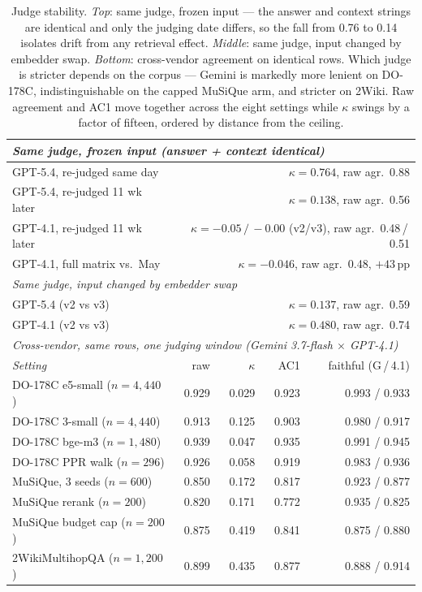 \begin{table}[t]
  \centering
  \caption{Judge stability. \textit{Top}: same judge, frozen input --- the answer and context strings are identical and only the judging date differs, so the fall from 0.76 to 0.14 isolates drift from any retrieval effect. \textit{Middle}: same judge, input changed by embedder swap. \textit{Bottom}: cross-vendor agreement on identical rows. Which judge is stricter depends on the corpus --- Gemini is markedly more lenient on DO-178C, indistinguishable on the capped MuSiQue arm, and stricter on 2Wiki. Raw agreement and AC1 move together across the eight settings while $\kappa$ swings by a factor of fifteen, ordered by distance from the ceiling.}
  \label{tab:judges}
  \small
  \setlength{\tabcolsep}{4pt}
    \begin{tabular}{l rrrr}
    \toprule
    \multicolumn{5}{l}{\textit{Same judge, frozen input (answer + context identical)}} \\
    \midrule
    GPT-5.4, re-judged same day & \multicolumn{4}{r}{$\kappa = 0.764$, raw agr.\ 0.88} \\
    GPT-5.4, re-judged 11 wk later & \multicolumn{4}{r}{$\kappa = 0.138$, raw agr.\ 0.56} \\
    GPT-4.1, re-judged 11 wk later & \multicolumn{4}{r}{$\kappa = -0.05\,/\,-0.00$ (v2/v3), raw agr.\ 0.48\,/\,0.51} \\
    GPT-4.1, full matrix vs.\ May & \multicolumn{4}{r}{$\kappa = -0.046$, raw agr.\ 0.48, $+43$\,pp} \\
    \midrule
    \multicolumn{5}{l}{\textit{Same judge, input changed by embedder swap}} \\
    \midrule
    GPT-5.4 (v2 vs v3) & \multicolumn{4}{r}{$\kappa = 0.137$, raw agr.\ 0.59} \\
    GPT-4.1 (v2 vs v3) & \multicolumn{4}{r}{$\kappa = 0.480$, raw agr.\ 0.74} \\
    \midrule
    \multicolumn{5}{l}{\textit{Cross-vendor, same rows, one judging window (Gemini 3.7-flash $\times$ GPT-4.1)}} \\
    \midrule
    \textit{Setting} & raw & $\kappa$ & AC1 & faithful (G\,/\,4.1) \\
    \midrule
    DO-178C e5-small ($n{=}4{,}440$) & 0.929 & 0.029 & 0.923 & 0.993 / 0.933 \\
    DO-178C 3-small ($n{=}4{,}440$)  & 0.913 & 0.125 & 0.903 & 0.980 / 0.917 \\
    DO-178C bge-m3 ($n{=}1{,}480$)   & 0.939 & 0.047 & 0.935 & 0.991 / 0.945 \\
    DO-178C PPR walk ($n{=}296$)     & 0.926 & 0.058 & 0.919 & 0.983 / 0.936 \\
    MuSiQue, 3 seeds ($n{=}600$)     & 0.850 & 0.172 & 0.817 & 0.923 / 0.877 \\
    MuSiQue rerank ($n{=}200$)       & 0.820 & 0.171 & 0.772 & 0.935 / 0.825 \\
    MuSiQue budget cap ($n{=}200$)   & 0.875 & 0.419 & 0.841 & 0.875 / 0.880 \\
    2WikiMultihopQA ($n{=}1{,}200$)  & 0.899 & 0.435 & 0.877 & 0.888 / 0.914 \\
    \bottomrule
  \end{tabular}
\end{table}
